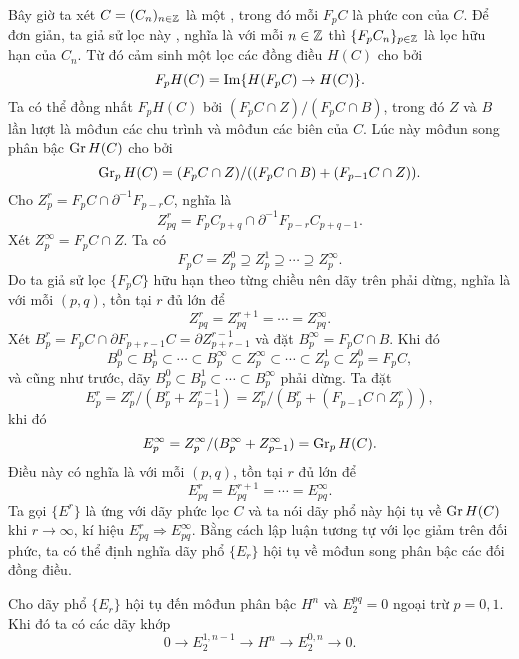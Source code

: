 \begin{define}
    Bây giờ ta xét $C = (C_n)_{n \in \mathbb Z}$ là một , trong đó mỗi $F_pC$ là phức con của $C$. Để đơn giản, ta giả sử lọc này , nghĩa là với mỗi $n \in \mathbb Z$ thì $\{F_pC_n\}_{p \in \mathbb Z}$ là lọc hữu hạn của $C_n$. Từ đó cảm sinh một lọc các đồng điều $H(C)$ cho bởi
    $$
        F_pH(C) = \operatorname{Im}\{H(F_pC) \rightarrow H(C)\}.
    $$
    Ta có thể đồng nhất $F_pH(C)$ bởi $(F_pC \cap Z)/(F_pC \cap B)$, trong đó $Z$ và $B$ lần lượt là môđun các chu trình và môđun các biên của $C$. Lúc này môđun song phân bậc $\operatorname{Gr} H(C)$ cho bởi
    $$
        \operatorname{Gr}_pH(C) = (F_pC \cap Z) / ((F_pC \cap B) + (F_{p-1}C \cap Z)).
    $$
    Cho $Z^r_p = F_pC \cap \partial^{-1}F_{p-r}C$, nghĩa là
    $$
        Z^r_{pq} = F_p C_{p+q} \cap \partial^{-1} F_{p-r}C_{p+q-1}.
    $$
    Xét $Z_p^{\infty} = F_pC \cap Z$. Ta có
    $$
        F_pC = Z_p^0 \supseteq Z_p^1 \supseteq \cdots \supseteq Z_p^{\infty}.
    $$
    Do ta giả sử lọc $\{F_pC\}$ hữu hạn theo từng chiều nên dãy trên phải dừng, nghĩa là với mỗi $(p,q)$, tồn tại $r$ đủ lớn để
    $$
        Z_{pq}^r = Z_{pq}^{r+1} = \cdots = Z_{pq}^{\infty}.
    $$
    Xét $B_p^r = F_pC \cap \partial F_{p+r-1}C = \partial Z^{r-1}_{p+r-1}$ và đặt $B_p^{\infty} = F_pC \cap B$. Khi đó
    $$
        B_p^0 \subset B_p^1 \subset \cdots \subset B_p^{\infty} \subset Z_p^{\infty} \subset \cdots \subset Z_p^1 \subset Z_p^0 = F_pC,
    $$
    và cũng như trước, dãy $B_p^0 \subset B_p^1 \subset \cdots \subset B_p^{\infty}$ phải dừng. Ta đặt
    $$
        E_p^r = Z_p^r / (B_p^r + Z_{p-1}^{r-1}) = Z_p^r / (B_p^r + (F_{p-1}C \cap Z_p^r)),
    $$
    khi đó
    $$
        E_p^{\infty} = Z_p^{\infty} / (B_p^{\infty} + Z_{p-1}^{\infty}) = \operatorname{Gr}_pH(C).
    $$
    Điều này có nghĩa là với mỗi $(p,q)$, tồn tại $r$ đủ lớn để
    $$
        E_{pq}^r = E_{pq}^{r+1} = \cdots = E_{pq}^{\infty}.
    $$
    Ta gọi $\{E^r\}$ là  ứng với dãy phức lọc $C$ và ta nói dãy phổ này hội tụ về $\operatorname{Gr} H(C)$ khi $r \rightarrow \infty$, kí hiệu $E_{pq}^r \Rightarrow E^{\infty}_{pq}$. Bằng cách lập luận tương tự với lọc giảm trên đối phức, ta có thể định nghĩa dãy phổ $\{E_r\}$ hội tụ về môđun song phân bậc các đối đồng điều.
\end{define}

\begin{proposition}\label{prop:spec-exact}
    Cho dãy phổ $\{E_r\}$ hội tụ đến môđun phân bậc $H^n$ và $E_2^{pq} = 0$ ngoại trừ $p=0,1$. Khi đó ta có các dãy khớp
    $$
        0 \rightarrow E_2^{1,n-1} \rightarrow H^n \rightarrow E_2^{0,n} \rightarrow 0.
    $$
\end{proposition}

